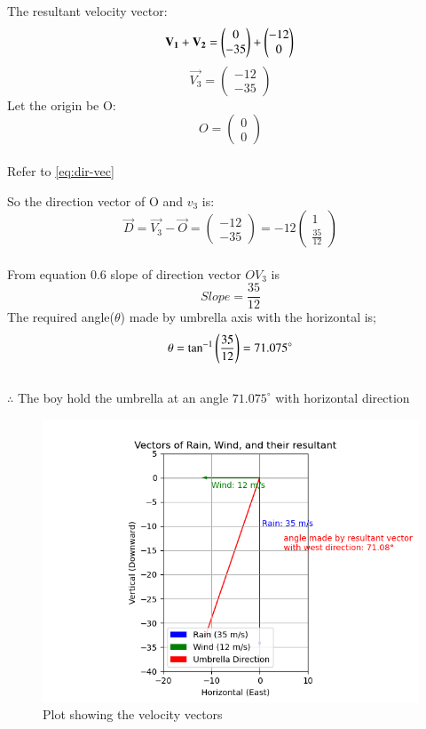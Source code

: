 \documentclass[journal]{IEEEtran}
\begin{document}
The resultant velocity vector:\\
\begin{equation}
\vec{V_{1}}+\vec{V_{2}}=\begin{pmatrix}
    0\\
    -35
\end{pmatrix}
+
\begin{pmatrix}
    -12\\
    0
\end{pmatrix}\\
\end{equation}
\begin{equation}
    \vec{V_{3}}=\begin{pmatrix}
        -12\\
        -35
    \end{pmatrix}
\end{equation}
Let the origin be O:
\begin{equation}
    O=\begin{pmatrix}
        0\\
        0
    \end{pmatrix}
\end{equation}\\
 Refer to \eqref{eq:dir-vec}


So the direction vector of O and $v_{3}$ is:
\begin{equation}
    \vec{D}=\vec{V_{3}}-\vec{O}=\begin{pmatrix}
        -12\\
        -35
    \end{pmatrix}
=-12\begin{pmatrix}
    1\\
    \frac{35}{12}
\end{pmatrix}
\end{equation}\\
From equation 0.6 slope of direction vector $OV_{3}$ is\\
\begin{equation}
    Slope=\frac{35}{12}
\end{equation}
The required angle($\theta$) made by umbrella axis with the horizontal is;\\
\begin{equation}
    \theta=\tan^{-1}\brak{\frac{35}{12}}=71.075^\circ
\end{equation}\\

 $\therefore$ The boy hold the umbrella at an angle $71.075^\circ$ with           horizontal direction \\

 \begin{figure}[h!]
   \centering
   \includegraphics[width=0.7\linewidth]{figs/figure1.png.jpg}
   \caption{Plot showing the velocity vectors}
   \label{stemplot}
\end{figure}
\end{document}
